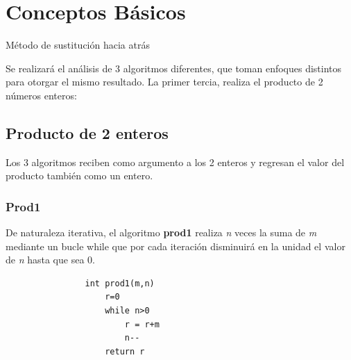 \documentclass{report}
\begin{document}
\section*{Conceptos B\'asicos}
    Método de sustitución hacia atrás
    
    Se realizará el análisis de 3 algoritmos diferentes, que toman enfoques distintos para otorgar el mismo resultado.
    La primer tercia, realiza el producto de 2 números enteros:
    \subsection*{Producto de 2 enteros}
    Los 3 algoritmos reciben como argumento a los 2 enteros y regresan el valor del producto también como un entero.\\
        \subsubsection*{Prod1}
            De naturaleza iterativa, el algoritmo \textbf{prod1} realiza \textit{n} veces la suma de \textit{m} mediante un bucle while que por cada iteración disminuirá en la unidad el valor de \textit{n} hasta que sea 0.
            \begin{verbatim}
                int prod1(m,n)
                    r=0
                    while n>0
                        r = r+m
                        n--
                    return r
            \end{verbatim}
\end{document}
